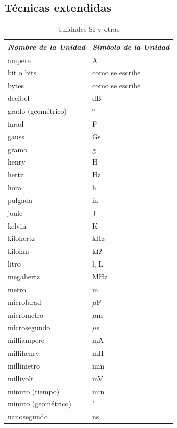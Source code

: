 \documentclass
  [ams,pdfout]%
	{aeslac}
\begin{document}
\subsection{Técnicas extendidas}


\begin{table}[!ht]
\caption{Unidades SI y otras}
\label{tab:units}
\vspace*{10pt}
\centering
\small
\begin{tabular}{ll}
\textit{Nombre de la Unidad}	&	\textit{Símbolo de la Unidad}\\ \hline
ampere             		&	A\\
bit o bits        		&	como se escribe\\
bytes              		&	como se escribe\\
decibel           		&	dB\\
grado (geométrico)     	&	$^\textrm{o}$\\
farad             		&	F\\
gauss             		&	Gs\\
gramo             		&	g\\
henry              		&	H\\
hertz             		&	Hz\\
hora              		&	h\\
pulgada             		&	in\\
joule              		&	J\\
kelvin             		&	K\\
kilohertz          		&	kHz\\
kilohm                		&	k$\Omega$\\
litro             		&	l, L\\
megahertz         		&	MHz\\
metro              		&	m\\
microfarad         		&	$\mu$F\\
micrometro         		&	$\mu$m\\
microsegundo        		&	$\mu$s\\
milliampere        		&	mA\\
millihenry         		&	mH\\
millimetro         		&	mm\\
millivolt          		&	mV\\
minuto (tiempo)        		&	min\\
minuto (geométrico)     	&      	'\\
nanosegundo         		&	ns\\

\end{tabular}
\end{table}
\end{document}
